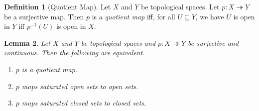 \documentclass{report}
\newtheorem{lm}{Lemma}[section]
\theoremstyle{definition}
\newtheorem{df}[lm]{Definition}
\begin{document}
  \begin{df}[Quotient Map]
    Let $X$ and $Y$ be topological spaces. Let $p : X \twoheadrightarrow Y$ be
    a
    surjective map. Then $p$ is a \emph{quotient map} iff, for all $U \subseteq
    Y$, we have $U$ is open in $Y$ iff $p^{-1}(U)$ is open in $X$.
  \end{df}

  \begin{lm}
    \label{lm:topology:quotient:saturated}
    Let $X$ and $Y$ be topological spaces and $p : X \twoheadrightarrow Y$ be
    surjective and continuous. Then the following are equivalent.
    \begin{enumerate}
      \item $p$ is a quotient map.
      \item $p$ maps saturated open sets to open sets.
      \item $p$ maps saturated closed sets to closed sets.
    \end{enumerate}
  \end{lm}
\end{document}
